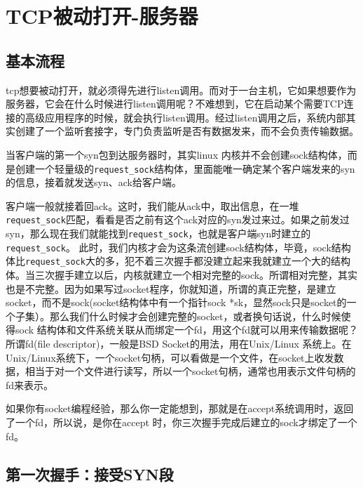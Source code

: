 \section{TCP被动打开-服务器}
\label{sec:tcp_server_connect}
        \subsection{基本流程}
            tcp想要被动打开，就必须得先进行listen调用。而对于一台主机，它如果想要作为服务器，它会在什么时候进行listen调用呢？不难想到，它在启动某个需要TCP连接的高级应用程序的时候，就会执行listen调用。经过listen调用之后，系统内部其实创建了一个监听套接字，专门负责监听是否有数据发来，而不会负责传输数据。

            当客户端的第一个syn包到达服务器时，其实linux 内核并不会创建sock结构体，而是创建一个轻量级的\texttt{request_sock}结构体，里面能唯一确定某个客户端发来的syn的信息，接着就发送syn、ack给客户端。

            客户端一般就接着回ack。这时，我们能从ack中，取出信息，在一堆\texttt{request_sock}匹配，看看是否之前有这个ack对应的syn发过来过。如果之前发过syn，那么现在我们就能找到\texttt{request_sock}，也就是客户端syn时建立的\texttt{request_sock}。 此时，我们内核才会为这条流创建sock结构体，毕竟，sock结构体比\texttt{request_sock}大的多，犯不着三次握手都没建立起来我就建立一个大的结构体。当三次握手建立以后，内核就建立一个相对完整的sock。所谓相对完整，其实也是不完整。因为如果写过socket程序，你就知道，所谓的真正完整，是建立socket，而不是sock(socket结构体中有一个指针sock *sk，显然sock只是socket的一个子集）。那么我们什么时候才会创建完整的socket，或者换句话说，什么时候使得sock 结构体和文件系统关联从而绑定一个fd，用这个fd就可以用来传输数据呢？所谓fd(file descriptor)，一般是BSD Socket的用法，用在Unix/Linux 系统上。在Unix/Linux系统下，一个socket句柄，可以看做是一个文件，在socket上收发数据，相当于对一个文件进行读写，所以一个socket句柄，通常也用表示文件句柄的fd来表示。

            如果你有socket编程经验，那么你一定能想到，那就是在accept系统调用时，返回了一个fd，所以说，是你在accept 时，你三次握手完成后建立的sock才绑定了一个 fd。
        \subsection{第一次握手：接受SYN段}
